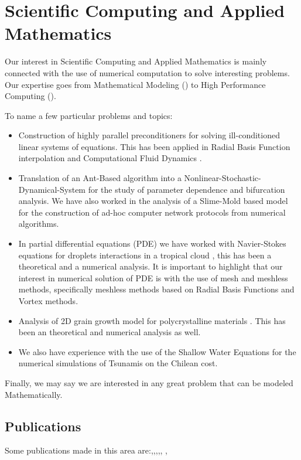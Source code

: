 \section{Scientific Computing and Applied Mathematics}
Our interest in Scientific Computing and Applied Mathematics is
mainly connected with the use of numerical computation to
solve interesting problems. Our expertise goes from
Mathematical Modeling (\cite{Emelianenko2014,Li2011,Li2010,Torres2010}) to High Performance Computing 
(\cite{Emelianenko2014,Torres2012,Torres2009}).

To name a few particular problems and topics:

\begin{itemize}
 \item Construction of highly parallel preconditioners for solving ill-conditioned linear systems of equations.
      This has been applied in Radial Basis Function interpolation \cite{Torres2009} and Computational Fluid Dynamics
      \cite{Torres2012}.
 \item Translation of an Ant-Based algorithm into a Nonlinear-Stochastic-Dynamical-System for the
  study of parameter dependence \cite{Torres2010} and bifurcation analysis.
  We have also worked in the analysis of a Slime-Mold based model for the construction of
  ad-hoc computer network protocols \cite{Li2011,Li2010} from numerical algorithms.
 \item In partial differential equations (PDE) we have worked with Navier-Stokes equations for
  droplets interactions in a tropical cloud \cite{Torres2012}, this has been a theoretical
  and a numerical analysis. 
  It is important to highlight that our interest in numerical solution of PDE 
  is with the use of mesh and meshless methods,
  specifically meshless methods based on Radial Basis Functions and Vortex methods.
 \item Analysis of 2D grain growth model for polycrystalline materials \cite{Emelianenko2014}.
 This has been an theoretical and numerical analysis as well.
 \item We also have experience with the use of the Shallow Water Equations for the 
 numerical simulations of Tsunamis on the Chilean cost.
\end{itemize}

Finally, we may say we are interested in any great problem that can be modeled Mathematically.

\subsection{Publications}

Some publications made in this area
are:\cite{Emelianenko2014},\cite{Torres2012},\cite{Wang2011L},\cite{Li2011},\cite{Li2010},
\cite{Torres2010},\cite{Torres2009}

